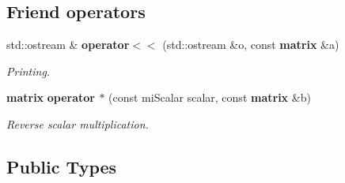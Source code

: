 \subsection*{Friend operators}
\begin{CompactItemize}
\item 
std::ostream \& {\bf operator$<$$<$} (std::ostream \&o, const {\bf matrix} \&a)
\begin{CompactList}\small\item\em Printing. \item\end{CompactList}\item 
{\bf matrix} {\bf operator $\ast$} (const mi\-Scalar scalar, const {\bf matrix} \&b)
\begin{CompactList}\small\item\em Reverse scalar multiplication. \item\end{CompactList}\end{CompactItemize}
\subsection*{Public Types}
